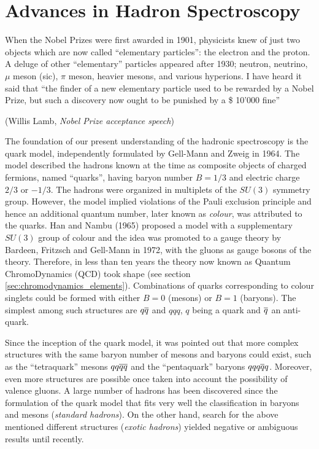 \chapter{Advances in Hadron Spectroscopy}

\epigraph{When the Nobel Prizes were first awarded in 1901, physicists knew of just two objects which are now called ``elementary particles'': the electron and the proton. A deluge of other ``elementary'' particles appeared after 1930; neutron, neutrino, $\mu$ meson (sic), $\pi$ meson, heavier mesons, and various hyperions. I have heard it said that ``the finder of a new elementary particle used to be rewarded by a Nobel Prize, but such a discovery now ought to be punished by a \$ 10'000 fine''}{(Willis Lamb, \emph{Nobel Prize acceptance speech})}

The foundation of our present understanding of the hadronic spectroscopy is the quark model, independently formulated by Gell-Mann and Zweig in 1964. The model described the hadrons known at the time as composite objects of charged fermions, named ``quarks'', having baryon number $B = 1/3$ and electric charge $2/3$ or $-1/3$. The hadrons were organized in multiplets of the $SU(3)$ symmetry group. However, the model implied violations of the Pauli exclusion principle and hence an additional quantum number, later known as \emph{colour}, was attributed to the quarks. Han and Nambu (1965) proposed a model with a supplementary $SU(3)$ group of colour and the idea was promoted to a gauge theory by Bardeen, Fritzsch and Gell-Mann in 1972, with the gluons as gauge bosons of the theory. Therefore, in less than ten years the theory now known as Quantum ChromoDynamics (QCD) took shape (see section \ref{sec:chromodynamics_elements}). Combinations of quarks corresponding to colour singlets could be formed with either $B = 0$ (mesons) or $B = 1$ (baryons). The simplest among such structures are $q \overline{q}$ and $qqq$, $q$ being a quark and $\overline{q}$ an anti-quark. 

Since the inception of the quark model, it was pointed out that more complex structures with the same baryon number of mesons and baryons could exist, such as the ``tetraquark'' mesons $q q \overline{q} \overline{q}$ and the ``pentaquark'' baryons $q q q \overline{q} q$. Moreover, even more structures are possible once taken into account the possibility of valence gluons. A large number of hadrons has been discovered since the formulation of the quark model that fits very well the classification in baryons and mesons (\emph{standard hadrons}). On the other hand, search for the above mentioned different structures (\emph{exotic hadrons}) yielded negative or ambiguous results until recently.

